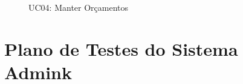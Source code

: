 \begin{apendicesenv}
    \begin{figure}[!htb]
	    \centering
	    \begin{minipage}{\wd0}
		    \caption[]{UC04: Manter Orçamentos}
		    \label{fig:uc4-admink}
	    \end{minipage}
    \end{figure}

\chapter{Plano de Testes do Sistema Admink}
\label{chap:apendiceB}


\end{apendicesenv}
